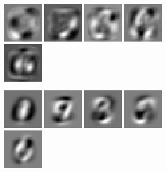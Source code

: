 \documentclass{revtex4-1}
\begin{document}
\begin{figure}
\begin{subfigure}{\linewidth}
    \includegraphics[width=.1\linewidth]{W_l_eigv_6.eps}
    \includegraphics[width=.1\linewidth]{W_l_eigv_7.eps}
    \includegraphics[width=.1\linewidth]{W_l_eigv_8.eps}
    \includegraphics[width=.1\linewidth]{W_l_eigv_9.eps}
    \includegraphics[width=.1\linewidth]{W_l_eigv_10.eps}
    \caption{}
    \label{fig:modes_tr}
  \end{subfigure}\par
  \begin{subfigure}{\linewidth}
    \includegraphics[width=.1\linewidth]{X_l_eigv_2.eps}
    \includegraphics[width=.1\linewidth]{X_l_eigv_3.eps}
    \includegraphics[width=.1\linewidth]{X_l_eigv_4.eps}
    \includegraphics[width=.1\linewidth]{X_l_eigv_5.eps}
    \includegraphics[width=.1\linewidth]{X_l_eigv_6.eps}

\end{subfigure}
\end{figure}
\end{document}
